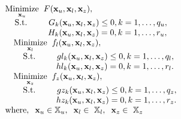 \begin{equation}
\begin{array}{lr} 
\underset{\mathbf{x}_u}{\text{Minimize}}\hspace{2mm} F(\mathbf{x}_u, \mathbf{ x}_l, \mathbf{ x}_z), \hspace{2mm} \\ 
\hspace{4mm}\text{S.t.}\hspace{9mm}G_k(\mathbf{x}_u, \mathbf{ x}_l, \mathbf{ x}_z) \le 0, k=1,\ldots,q_u, \hspace{2mm}\\
\hspace{18mm}H_k(\mathbf{x}_u, \mathbf{ x}_l, \mathbf{ x}_z) = 0, k=1,\ldots,r_u, \hspace{2mm}\\
\quad \underset{\mathbf{x}_l}{\text{Minimize}}\hspace{2mm} f_l(\mathbf{x}_u, \mathbf{ x}_l, \mathbf{ x}_z), \\
\quad\hspace{4mm}\text{S.t.}\hspace{9mm}gl_k(\mathbf{x}_u, \mathbf{ x}_l, \mathbf{ x}_z) \le 0, k=1,\ldots,q_l, \hspace{2mm}\\
\quad\hspace{18mm}hl_k(\mathbf{x}_u, \mathbf{ x}_l, \mathbf{ x}_z) = 0, k=1,\ldots,r_l. \hspace{1mm}\\
\quad\underset{\mathbf{x}_z} {\text{Minimize}}\hspace{2mm} f_z(\mathbf{x}_u, \mathbf{ x}_l, \mathbf{ x}_z), \\
\quad \hspace{4mm}\text{S.t.}\hspace{9mm}gz_k(\mathbf{x}_u, \mathbf{ x}_l, \mathbf{ x}_z) \le 0, k=1,\ldots,q_z, \hspace{2mm}\\
\quad\hspace{18mm}hz_k(\mathbf{x}_u, \mathbf{ x}_l, \mathbf{ x}_z) = 0, k=1,\ldots,r_z. \hspace{1mm}\\
\text {where},\hspace{2mm}{\mathbf{x}_u \in \mathbb{X}_u}, \hspace{2mm}{\mathbf{x}_l \in \ \mathbb{X}_l}, \hspace{2mm}{\mathbf{x}_z \in \ \mathbb{X}_z}
\end{array}
\label{eq:bilevel}
\end{equation}


